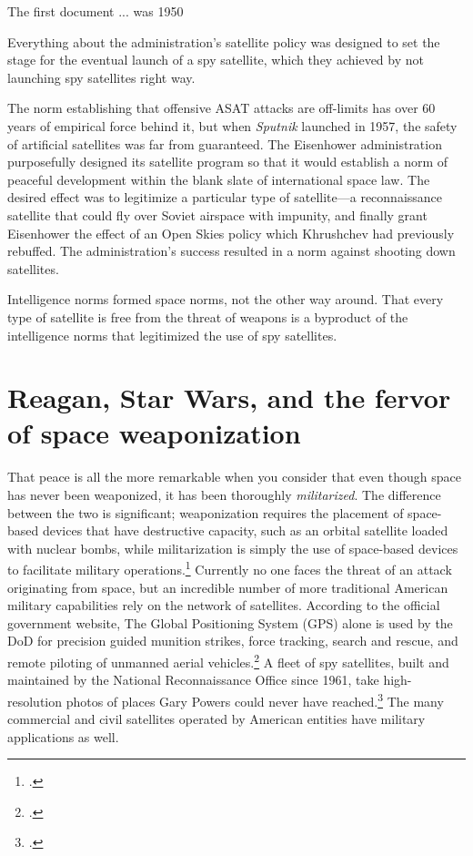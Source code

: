 \documentclass{report}
\begin{document}
The first document ... was 1950

Everything about the administration's satellite policy was designed to set the stage for the eventual launch of a spy satellite, which they achieved by not launching spy satellites right way.

The norm establishing that offensive ASAT attacks are off-limits has over 60 years of empirical force behind it, but when \emph{Sputnik} launched in 1957, the safety of artificial satellites was far from guaranteed. The Eisenhower administration purposefully designed its satellite program so that it would establish a norm of peaceful development within the blank slate of international space law. The desired effect was to legitimize a particular type of satellite---a reconnaissance satellite that could fly over Soviet airspace with impunity, and finally grant Eisenhower the effect of an Open Skies policy which Khrushchev had previously rebuffed. The administration's success resulted in a norm against shooting down satellites.

Intelligence norms formed space norms, not the other way around. That every type of satellite is free from the threat of weapons is a byproduct of the intelligence norms that legitimized the use of spy satellites.

\section{Reagan, Star Wars, and the fervor of space weaponization}
That peace is all the more remarkable when you consider that even though space has never been weaponized, it has been thoroughly \emph{militarized}. The difference between the two is significant; weaponization requires the placement of space-based devices that have destructive capacity, such as an orbital satellite loaded with nuclear bombs, while militarization is simply the use of space-based devices to facilitate military operations.\footcite[p.~3]{mowthorpe_militarization_2004} Currently no one faces the threat of an attack originating from space, but an incredible number of more traditional American military capabilities rely on the network of satellites. According to the official government website, The Global Positioning System (GPS) alone is used by the DoD for precision guided munition strikes, force tracking, search and rescue, and remote piloting of unmanned aerial vehicles.\footcite{national_coordination_office_for_space-based_positioning_navigation_and_timing_federal_2018} A fleet of spy satellites, built and maintained by the National Reconnaissance Office since 1961, take high-resolution photos of places Gary Powers could never have reached.\footcite{national_reconnaissance_office_about_2019} The many commercial and civil satellites operated by American entities have military applications as well.
\end{document}
